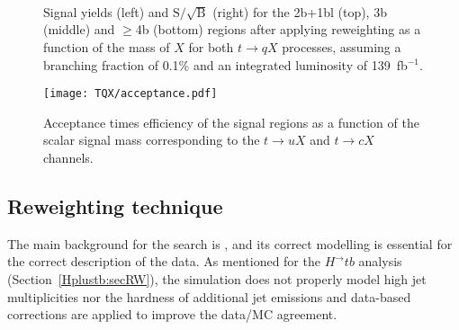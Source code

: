\begin{figure}[htbp]
    \RawFloats
    \begin{center}
         \\
         \\
         \\
    \caption{
        Signal yields (left) and $\text{S}/\sqrt{\text{B}}$ (right) for the 2b+1bl (top), 3b (middle) and $\geq$4b (bottom) regions after applying reweighting as a function of the mass of $X$ for both $t\to qX$ processes, assuming a branching fraction of 0.1\% and an integrated luminosity of 139~fb$^{-1}$.
    }
    \label{tqX:signalyields}
    \end{center}
\end{figure}

\begin{figure}[htbp]
    \RawFloats
    \begin{center}
    \texttt{[image: TQX/acceptance.pdf]}
    \caption{
        Acceptance times efficiency of the signal regions as a function of the scalar signal mass corresponding to
the $t\to uX$ and $t\to cX$ channels.
    }
    \label{tqX:acceptance}
    \end{center}
\end{figure}

\clearpage
\subsection{Reweighting technique}
\label{tqX:secRW}
The main background for the search is \ttjets, and its correct modelling is essential for the correct description of the data. As mentioned for the $H^\to tb$ analysis (Section~\ref{Hplustb:secRW}), the simulation does not properly model high jet multiplicities nor the hardness of additional jet emissions and data-based corrections are applied to improve the data/MC agreement.\\

